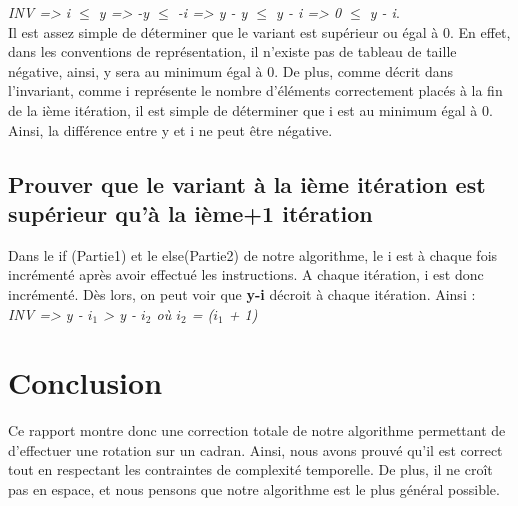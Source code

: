 \documentclass[a4paper, 12pt]{article}
\begin{document}
\textit{INV => i $\le$ y => -y $\le$ -i => y - y $\le$ y - i => 0 $\le$ y - i}. \\

Il est assez simple de déterminer que le variant est supérieur ou égal à 0. En effet, dans les conventions de représentation, il n'existe pas de tableau de taille négative, ainsi, y sera au minimum égal à 0. De plus, comme décrit dans l'invariant, comme i représente le nombre d'éléments correctement placés à la fin de la ième itération, il est simple de déterminer que i est au minimum égal à 0. Ainsi, la différence entre y et i ne peut être négative. 

\subsection{Prouver que le variant à la ième itération est supérieur qu'à la ième+1 itération}
Dans le if (Partie1) et le else(Partie2) de notre algorithme, le i est à chaque fois incrémenté après avoir effectué les instructions. A chaque itération, i est donc incrémenté. Dès lors, on peut voir que \textbf{y-i} décroit à chaque itération.
Ainsi : \\

\textit{INV => y - $i_{1}$ > y - $i_{2}$ où $i_{2}$ = ($i_{1}$ + 1)}


\section{Conclusion}
Ce rapport montre donc une correction totale de notre algorithme permettant de d'effectuer une rotation sur un cadran. Ainsi, nous avons prouvé qu'il est correct tout en respectant les contraintes de complexité temporelle. De plus, il ne croît pas en espace, et nous pensons que notre algorithme est le plus général possible.
\end{document}
